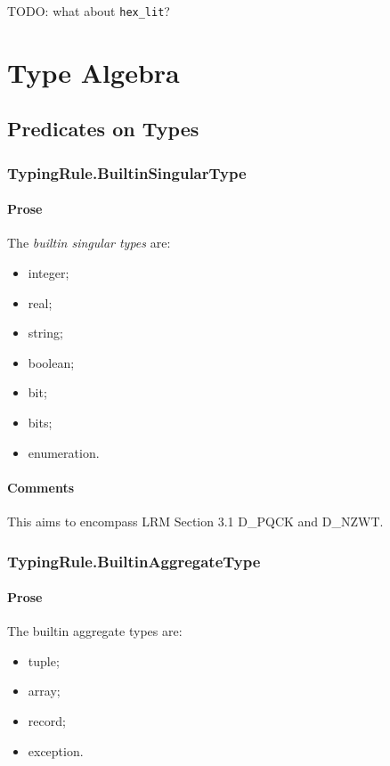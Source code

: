 \documentclass{book}
\begin{document}
TODO: what about \texttt{hex\_lit}?

\chapter{Type Algebra}

\section{Predicates on Types}

\subsection{TypingRule.BuiltinSingularType \label{sec:TypingRule.BuiltinSingularType}}

    \subsubsection{Prose}
    The \emph{builtin singular types} are:
    \begin{itemize}
    \item  integer; 
    \item  real;
    \item  string; 
    \item  boolean; 
    \item  bit;
    \item  bits;
    \item  enumeration.
    \end{itemize}

    \subsubsection{Comments}
    This aims to encompass LRM Section 3.1 D\_PQCK and D\_NZWT.

\subsection{TypingRule.BuiltinAggregateType \label{sec:TypingRule.BuiltinAggregateType}}

    \subsubsection{Prose}
    The builtin aggregate types are:
    \begin{itemize}
    \item  tuple;
    \item  array;
    \item  record;
    \item  exception.
    \end{itemize}
\end{document}
